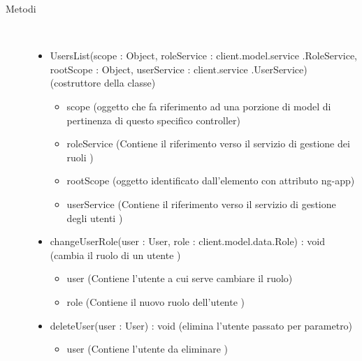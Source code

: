 \begin{description}
\item[Metodi] \hfill \\
 \vspace{-7mm}
\begin{itemize}
\item UsersList(scope : Object, roleService : client.model.service .RoleService, rootScope : Object, userService : client.service .UserService) (costruttore della classe)\begin{itemize}
\item scope (oggetto che fa riferimento ad una porzione di model di pertinenza di questo specifico controller)
\item roleService (Contiene il riferimento verso il servizio di gestione dei ruoli )
\item rootScope (oggetto identificato dall’elemento con attributo ng-app)
\item userService (Contiene il riferimento verso il servizio di gestione degli utenti )
\end{itemize}

\item changeUserRole(user  : User, role  : client.model.data.Role) : void (cambia il ruolo di un utente )\begin{itemize}
\item user  (Contiene l'utente a cui serve cambiare il ruolo)
\item role  (Contiene il nuovo ruolo dell'utente )
\end{itemize}

\item deleteUser(user  : User) : void (elimina l'utente passato per parametro)\begin{itemize}
\item user  (Contiene l'utente da eliminare )
\end{itemize}

\end{itemize}

\end{description}

